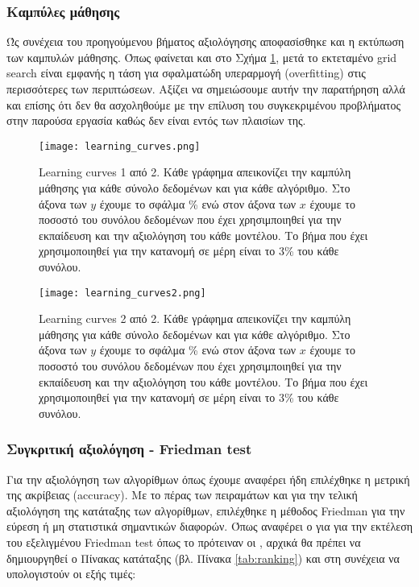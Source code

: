 \subsubsection{Καμπύλες μάθησης}

Ώς συνέχεια του προηγούμενου βήματος αξιολόγησης αποφασίσθηκε και η εκτύπωση των καμπυλών μάθησης. Όπως φαίνεται και στο Σχήμα \ref{fig:learning_curves}, μετά το εκτεταμένο grid search είναι εμφανής η τάση για σφαλματώδη υπεραρμογή (overfitting) στις περισσότερες των περιπτώσεων. Αξίζει να σημειώσουμε αυτήν την παρατήρηση αλλά και επίσης ότι δεν θα ασχοληθούμε με την επίλυση του συγκεκριμένου προβλήματος στην παρούσα εργασία καθώς δεν είναι εντός των πλαισίων της.

\begin{figure}
	\centering %
	\texttt{[image: learning\_curves.png]}
	\caption{Learning curves 1 από 2. Κάθε γράφημα απεικονίζει την καμπύλη μάθησης για κάθε σύνολο δεδομένων και για κάθε αλγόριθμο. Στο άξονα των $y$ έχουμε το σφάλμα \% ενώ στον άξονα των $x$ έχουμε το ποσοστό του συνόλου δεδομένων που έχει χρησιμποιηθεί για την εκπαίδευση και την αξιολόγηση του κάθε μοντέλου. Το βήμα που έχει χρησιμοποιηθεί για την κατανομή σε μέρη είναι το 3\% του κάθε συνόλου.}
	\label{fig:learning_curves}
\end{figure}

\begin{figure}
	\centering %
	\texttt{[image: learning\_curves2.png]}
	\caption{Learning curves 2 από 2. Κάθε γράφημα απεικονίζει την καμπύλη μάθησης για κάθε σύνολο δεδομένων και για κάθε αλγόριθμο. Στο άξονα των $y$ έχουμε το σφάλμα \% ενώ στον άξονα των $x$ έχουμε το ποσοστό του συνόλου δεδομένων που έχει χρησιμποιηθεί για την εκπαίδευση και την αξιολόγηση του κάθε μοντέλου. Το βήμα που έχει χρησιμοποιηθεί για την κατανομή σε μέρη είναι το 3\% του κάθε συνόλου.}
	\label{fig:learning_curves2}
\end{figure}


\subsubsection{Συγκριτική αξιολόγηση -  Friedman test}

Για την αξιολόγηση των αλγορίθμων όπως έχουμε αναφέρει ήδη επιλέχθηκε η μετρική της ακρίβειας (accuracy).
 Με το πέρας των πειραμάτων και για την τελική αξιολόγηση της κατάταξης των αλγορίθμων, 
 επιλέχθηκε η μέθοδος Friedman για την εύρεση ή μη στατιστικά σημαντικών διαφορών. 
 Όπως αναφέρει ο \citet{demvsar} για για την εκτέλεση του εξελιγμένου Friedman test όπως 
 το πρότειναν οι \citet{iman1980}, αρχικά θα πρέπει να δημιουργηθεί 
 ο Πίνακας κατάταξης (βλ. Πίνακα \ref{tab:ranking}) και στη συνέχεια να υπολογιστούν οι εξής τιμές:

